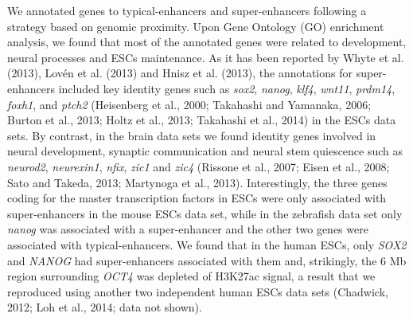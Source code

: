 		We annotated genes to typical-enhancers and super-enhancers following a strategy based on genomic proximity. Upon Gene Ontology (GO) enrichment analysis, we found that most of the annotated genes were related to development, neural processes and ESCs maintenance. As it has been reported by Whyte et al. (2013), Lov\'en et al. (2013) and Hnisz et al. (2013), the annotations for super-enhancers included key identity genes such as \textit{sox2}, \textit{nanog}, \textit{klf4}, \textit{wnt11}, \textit{prdm14}, \textit{foxh1}, and \textit{ptch2} (Heisenberg et al., 2000; Takahashi and Yamanaka, 2006; Burton et al., 2013; Holtz et al., 2013; Takahashi et al., 2014) in the ESCs data sets. By contrast, in the brain data sets we found identity genes involved in neural development, synaptic communication and neural stem quiescence such as \textit{neurod2}, \textit{neurexin1}, \textit{nfix}, \textit{zic1} and \textit{zic4} (Rissone et al., 2007; Eisen et al., 2008; Sato and Takeda, 2013; Martynoga et al., 2013). Interestingly, the three genes coding for the master transcription factors in ESCs were only associated with super-enhancers in the mouse ESCs data set, while in the zebrafish data set only \textit{nanog} was associated with a super-enhancer and the other two genes were associated with typical-enhancers. We found that in the human ESCs, only \textit{SOX2} and \textit{NANOG} had super-enhancers associated with them and, strikingly, the 6 Mb region surrounding \textit{OCT4} was depleted of H3K27ac signal, a result that we reproduced using another two independent human ESCs data sets (Chadwick, 2012; Loh et al., 2014; data not shown).\\

